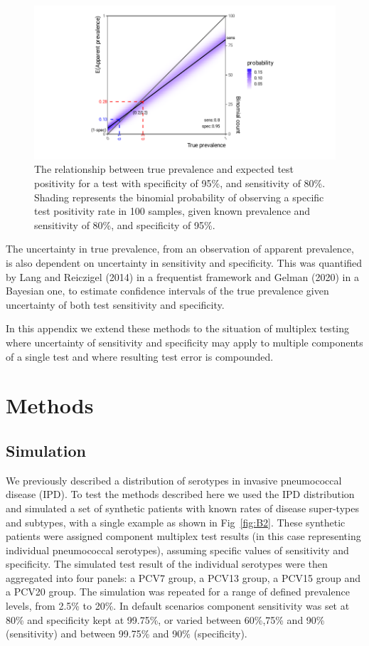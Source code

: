 \documentclass[a4paper, 12pt, twoside]{article}
\let\Oldsection\section
\renewcommand{\section}{\FloatBarrier\Oldsection}
\let\Oldsubsection\subsection
\renewcommand{\subsection}{\FloatBarrier\Oldsubsection}
\begin{document}
\begin{figure}[h!]
\centering
  \includegraphics{fig/rogan-gladen}
  \caption{The relationship between true prevalence and expected test positivity for a test with specificity of 95\%, and sensitivity of 80\%. Shading represents the binomial probability of observing a specific test positivity rate in 100 samples, given known prevalence and sensitivity of 80\%, and specificity of 95\%.}
\label{fig:B1}
\end{figure}

The uncertainty in true prevalence, from an observation of apparent prevalence, is also dependent on uncertainty in sensitivity and specificity. This was quantified by Lang and Reiczigel (2014)\cite{lang2014,flor2020} in a frequentist framework and Gelman (2020)\cite{gelman2020,flor2020} in a Bayesian one, to estimate confidence intervals of the true prevalence given uncertainty of both test sensitivity and specificity.

In this appendix we extend these methods to the situation of multiplex testing where uncertainty of sensitivity and specificity may apply to multiple components of a single test and where resulting test error is compounded.

\section{Methods}
\subsection{Simulation}

We previously described a distribution of serotypes in invasive pneumococcal disease (IPD)\cite{hyams2023a}. To test the methods described here we used the IPD distribution and simulated a set of synthetic patients with known rates of disease super-types and subtypes, with a single example as shown in Fig~\ref{fig:B2}. These synthetic patients were assigned component multiplex test results (in this case representing individual pneumococcal serotypes), assuming specific values of sensitivity and specificity. The simulated test result of the individual serotypes were then aggregated into four panels: a PCV7 group, a PCV13 group, a PCV15 group and a PCV20 group. The simulation was repeated for a range of defined prevalence levels, from 2.5\% to 20\%. In default scenarios component sensitivity was set at 80\% and specificity kept at 99.75\%, or varied between 60\%,75\% and 90\% (sensitivity) and between 99.75\% and 90\% (specificity).
\end{document}
